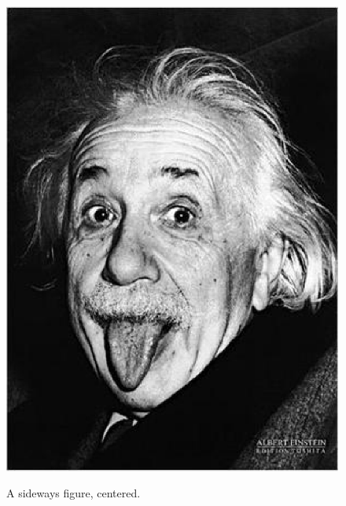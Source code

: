 \begin{figure}
  \centering
  \includegraphics{alberteinsteintongue.eps}\\
  \caption[A sideways figure.]{A sideways figure, centered.}\label{Fig:SidewaysFig}
\end{figure}
